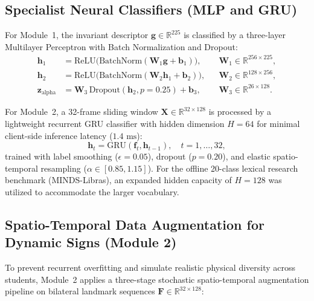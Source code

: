 \documentclass[12pt,a4paper]{article}
\begin{document}
\subsection{Specialist Neural Classifiers (MLP and GRU)}

For Module~1, the invariant descriptor $\mathbf{g} \in \mathbb{R}^{225}$ is classified by a three-layer Multilayer Perceptron with Batch Normalization and Dropout:
\begin{align}
    \mathbf{h}_1 &= \text{ReLU}\big(\text{BatchNorm}(\mathbf{W}_1 \mathbf{g} + \mathbf{b}_1)\big), && \mathbf{W}_1 \in \mathbb{R}^{256 \times 225}, \nonumber \\
    \mathbf{h}_2 &= \text{ReLU}\big(\text{BatchNorm}(\mathbf{W}_2 \mathbf{h}_1 + \mathbf{b}_2)\big), && \mathbf{W}_2 \in \mathbb{R}^{128 \times 256}, \label{eq:mlp} \\
    \mathbf{z}_{\text{alpha}} &= \mathbf{W}_3\,\text{Dropout}(\mathbf{h}_2, p=0.25) + \mathbf{b}_3, && \mathbf{W}_3 \in \mathbb{R}^{26 \times 128}. \nonumber
\end{align}

For Module~2, a 32-frame sliding window $\mathbf{X} \in \mathbb{R}^{32 \times 128}$ is processed by a lightweight recurrent GRU classifier with hidden dimension $H = 64$ for minimal client-side inference latency ($1.4\text{ ms}$):
\begin{equation}
    \mathbf{h}_t = \text{GRU}(\mathbf{f}_t, \mathbf{h}_{t-1}), \quad t = 1, \dots, 32,
    \label{eq:gru}
\end{equation}
trained with label smoothing ($\epsilon = 0.05$), dropout ($p = 0.20$), and elastic spatio-temporal resampling ($\alpha \in [0.85, 1.15]$). For the offline 20-class lexical research benchmark (MINDS-Libras), an expanded hidden capacity of $H = 128$ was utilized to accommodate the larger vocabulary.


\subsection{Spatio-Temporal Data Augmentation for Dynamic Signs (Module 2)}
\label{sec:augmentation}

To prevent recurrent overfitting and simulate realistic physical diversity across students, Module~2 applies a three-stage stochastic spatio-temporal augmentation pipeline on bilateral landmark sequences $\mathbf{F} \in \mathbb{R}^{32 \times 128}$:
\end{document}
